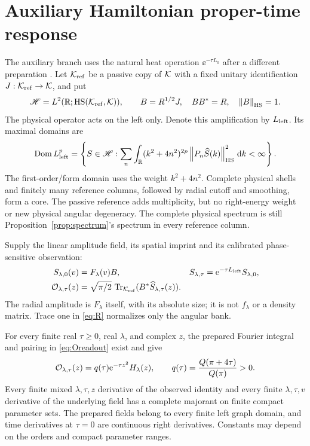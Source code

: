 \section{Auxiliary Hamiltonian proper-time response}\label{sec:aux}

The auxiliary branch uses the natural heat operation $\ee^{-\tau L_0}$
after a different preparation \cite{TNDAux,TNDAuxReview}.
Let $\mathcal K_{\rm ref}$ be a passive copy of $\mathcal K$ with a fixed unitary
identification $J:\mathcal K_{\rm ref}\to\mathcal K$, and put
\begin{equation}\label{eq:HSsetup}
 \mathscr H=L^2(\mathbb R;\operatorname{HS}(\mathcal K_{\rm ref},\mathcal K)),\qquad
 B=R^{1/2}J,\quad BB^*=R,\quad\left\lVert B\right\rVert_{\operatorname{HS}}=1.
\end{equation}
The physical operator acts on the left only. Denote this amplification
by $L_{\rm left}$. Its maximal domains are
\begin{equation}\label{eq:leftdomain}
 \operatorname{Dom} L_{\rm left}^p=\left\{S\in\mathscr H:
 \sum_n\int_\mathbb R(k^2+4n^2)^{2p}
 \left\lVert P_n\widehat S(k)\right\rVert_{\operatorname{HS}}^2\,\mathrm d k<\infty\right\}.
\end{equation}
The first-order/form domain uses the weight $k^2+4n^2$.
Complete physical shells and finitely many reference columns, followed
by radial cutoff and smoothing, form a core. The passive reference
adds multiplicity, but no right-energy weight or new physical angular
degeneracy. The complete physical spectrum is still
Proposition~\ref{prop:spectrum}'s spectrum in every reference column.

Supply the linear amplitude field, its spatial imprint and its calibrated
phase-sensitive observation:
\begin{align}
 S_{\lambda,0}(v)&=F_\lambda(v)B,&
 S_{\lambda,\tau}&=\mathrm e^{-\tau L_{\rm left}}S_{\lambda,0},\label{eq:Sprep}\\
 \mathcal O_{\lambda,\tau}(z)
 &=\sqrt{\pi/2}\,\operatorname{Tr}_{\mathcal K_{\rm ref}}(B^*\widehat S_{\lambda,\tau}(z)).
 \label{eq:Oreadout}
\end{align}
The radial amplitude is $F_\lambda$ itself, with its absolute size;
it is not $f_\lambda$ or a density matrix. Trace one in \eqref{eq:R}
normalizes only the angular bank.

\begin{theorem}\label{thm:aux}
For every finite real $\tau\ge0$, real $\lambda$, and complex $z$,
the prepared Fourier integral and pairing in \eqref{eq:Oreadout} exist
and give
\begin{equation}\label{eq:auxresponse}
 \mathcal O_{\lambda,\tau}(z)=q(\tau)\mathrm e^{-\tau z^2}H_\lambda(z),\qquad
 q(\tau)=\frac{Q(\pi+4\tau)}{Q(\pi)}>0.
\end{equation}
Every finite mixed $\lambda,\tau,z$ derivative of the observed identity
and every finite $\lambda,\tau,v$ derivative of the underlying field
has a complete majorant on finite compact parameter sets.
The prepared fields belong to every finite left graph domain, and
time derivatives at $\tau=0$ are continuous right derivatives.
Constants may depend on the orders and compact parameter ranges.
\end{theorem}

